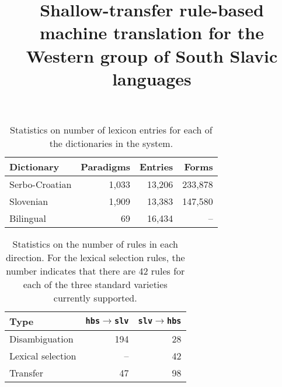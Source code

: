 \documentclass[10pt, a4paper]{article}
\title{Shallow-transfer rule-based machine translation for the Western group of South Slavic languages}
\begin{document}
\maketitleabstract














\begin{table}

\begin{center}
\begin{tabular}{|l|rrr|}
\hline
\textbf{Dictionary} & \textbf{Paradigms} & \textbf{Entries} & \textbf{Forms} \\
\hline
Serbo-Croatian &  1,033 & 13,206 & 233,878 \\
Slovenian &  1,909 & 13,383 & 147,580 \\
\hline
Bilingual &  69 &  16,434 & -- \\
\hline
\end{tabular}
\caption{Statistics on number of lexicon entries for each of the dictionaries in the 
   system.}
\end{center}

\end{table}

\begin{table}
\begin{center}
\begin{tabular}{|l|rr|}
\hline
 \textbf{Type}      & \texttt{hbs}$\rightarrow$\texttt{slv} & \texttt{slv}$\rightarrow$\texttt{hbs}\\
\hline
Disambiguation      &     194              &     28 \\
Lexical selection   &     --            &  42 \\
Transfer            &                47 &  98 \\
\hline

\end{tabular}
 \caption{Statistics on the number of rules in each direction. For the lexical selection rules, 
   the number indicates that there are 42 rules for each of the three standard varieties currently
   supported.}
\end{center}
\end{table}


\end{document}
